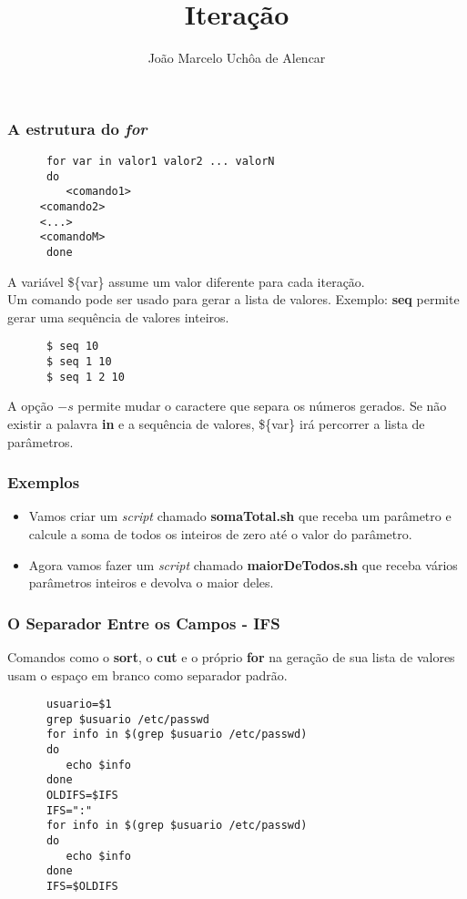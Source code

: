 \documentclass{beamer}
\title{Iteração}
\author[João Marcelo Uchôa de Alencar]{João Marcelo Uchôa de Alencar}
\institute{Universidade Federal do Ceará - Quixadá}
\begin{document}
   \begin{frame}
      \titlepage
   \end{frame}

   \begin{frame}[fragile]
      \frametitle{A estrutura do \textit{for}}
      \begin{verbatim}
      for var in valor1 valor2 ... valorN
      do
         <comando1>
	 <comando2>
	 <...>
	 <comandoM>
      done
      \end{verbatim}
      A variável \$\{var\} assume um valor diferente para cada iteração. \\
      Um comando pode ser usado para gerar a lista de valores. Exemplo: \textbf{seq} permite gerar uma sequência de valores inteiros. \\
      \begin{verbatim}
      $ seq 10 
      $ seq 1 10 
      $ seq 1 2 10 
      \end{verbatim}
      A opção $-s$ permite mudar o caractere que separa os números gerados. Se não existir a palavra \textbf{in} e a sequência de valores, \$\{var\} irá percorrer a lista de parâmetros. \\
\end{frame}

   \begin{frame}
      \frametitle{Exemplos}
      \begin{itemize}
         \item Vamos criar um \textit{script} chamado \textbf{somaTotal.sh} que receba um parâmetro e calcule a soma de todos os inteiros de zero até o valor do parâmetro.
	 \item Agora vamos fazer um \textit{script} chamado \textbf{maiorDeTodos.sh} que receba vários parâmetros inteiros e devolva o maior deles.
      \end{itemize}
   \end{frame}

   \begin{frame}[fragile]
      \frametitle{O Separador Entre os Campos - IFS}
      Comandos como o \textbf{sort}, o \textbf{cut} e o próprio \textbf{for} na geração de sua lista de valores usam o espaço em branco como separador padrão. \\
      \begin{verbatim}
      usuario=$1
      grep $usuario /etc/passwd
      for info in $(grep $usuario /etc/passwd)
      do
         echo $info
      done
      OLDIFS=$IFS
      IFS=":"
      for info in $(grep $usuario /etc/passwd)
      do
         echo $info
      done
      IFS=$OLDIFS
      \end{verbatim}
\end{frame}
\end{document}
